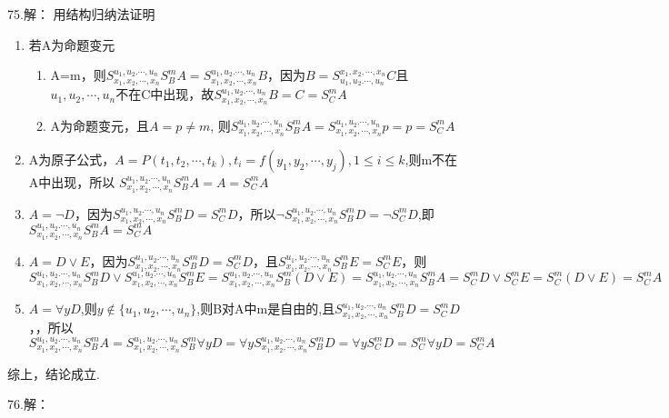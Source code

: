 \documentclass[a4paper]{ctexart}
\begin{document}
\noindent 75.解：
用结构归纳法证明
\begin{enumerate}
  \item 若A为命题变元
  \begin{enumerate}
    \item A=m，则$S^{u_1,u_2.\cdots,u_n}_{x_1,x_2,\cdots,x_n}S^m_BA=S^{u_1,u_2.\cdots,u_n}_{x_1,x_2,\cdots,x_n}B$，因为$B=S_{u_1,u_2.\cdots,u_n}^{x_1,x_2,\cdots,x_n}C$且${u_1,u_2,\cdots,u_n}$不在C中出现，故$S^{u_1,u_2.\cdots,u_n}_{x_1,x_2,\cdots,x_n}B=C=S_C^mA$
    \item A为命题变元，且$A=p\neq m$, 则$S^{u_1,u_2.\cdots,u_n}_{x_1,x_2,\cdots,x_n}S^m_BA=S^{u_1,u_2.\cdots,u_n}_{x_1,x_2,\cdots,x_n}p=p=S_C^mA$
  \end{enumerate}
  \item A为原子公式，$A=P(t_1,t_2,\cdots,t_k),t_i=f(y_1,y_2,\cdots,y_j),1\leq i\leq k$,则m不在A中出现，所以 $S^{u_1,u_2.\cdots,u_n}_{x_1,x_2,\cdots,x_n}S^m_BA=A=S_C^mA$
  \item $A=\neg D$，因为$S^{u_1,u_2.\cdots,u_n}_{x_1,x_2,\cdots,x_n}S^m_BD=S_C^mD$，所以$\neg S^{u_1,u_2.\cdots,u_n}_{x_1,x_2,\cdots,x_n}S^m_BD=\neg S_C^mD$,即$S^{u_1,u_2.\cdots,u_n}_{x_1,x_2,\cdots,x_n}S^m_BA=S_C^mA$
  \item $A=D\vee E$，因为$S^{u_1,u_2.\cdots,u_n}_{x_1,x_2,\cdots,x_n}S^m_BD=S_C^mD$，且$S^{u_1,u_2.\cdots,u_n}_{x_1,x_2,\cdots,x_n}S^m_BE=S_C^mE$，则$S^{u_1,u_2.\cdots,u_n}_{x_1,x_2,\cdots,x_n}S^m_BD\vee S^{u_1,u_2.\cdots,u_n}_{x_1,x_2,\cdots,x_n}S^m_BE=S^{u_1,u_2.\cdots,u_n}_{x_1,x_2,\cdots,x_n}S^m_B( D\vee E ) =S^{u_1,u_2.\cdots,u_n}_{x_1,x_2,\cdots,x_n}S^m_BA=S_C^mD \vee S_C^mE=S_C^m(D \vee E)=S_C^mA$
  \item $A=\forall{y}D$,则$y\not\in\{u_1,u_2,\cdots,u_n\}$,则B对A中m是自由的,且$S^{u_1,u_2.\cdots,u_n}_{x_1,x_2,\cdots,x_n}S^m_BD=S_C^mD$，，所以$S^{u_1,u_2.\cdots,u_n}_{x_1,x_2,\cdots,x_n}S^m_BA=S^{u_1,u_2.\cdots,u_n}_{x_1,x_2,\cdots,x_n}S^m_B\forall{y}D=\forall{y}S^{u_1,u_2.\cdots,u_n}_{x_1,x_2,\cdots,x_n}S^m_BD=\forall{y}S_C^mD=S_C^m\forall{y}D=S_C^mA$
\end{enumerate}
综上，结论成立.\newline

\noindent 76.解：
  
  
\end{document}
